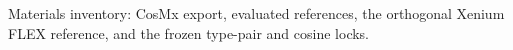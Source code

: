 Materials inventory: CosMx export, evaluated references, the orthogonal Xenium FLEX reference, and the frozen type-pair and cosine locks.